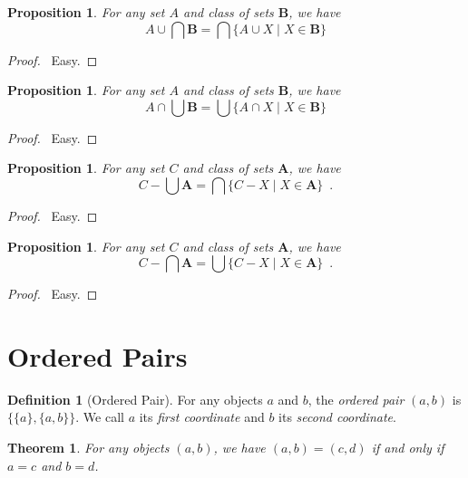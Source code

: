 \documentclass{article}
\let\qed\relax
\newtheorem{proposition}[axiom]{Proposition}
\newtheorem{theorem}[axiom]{Theorem}
\theoremstyle{definition}
\newtheorem{definition}[axiom]{Definition}
\begin{document}
    \begin{proposition}
        For any set $A$ and class of sets $\mathbf{B}$, we have
        \[ A \cup \bigcap \mathbf{B} = \bigcap \{ A \cup X \mid X \in \mathbf{B} \} \]
    \end{proposition}

    \begin{proof}
        \pf\ Easy. \qed
    \end{proof}

    \begin{proposition}
        For any set $A$ and class of sets $\mathbf{B}$, we have
        \[ A \cap \bigcup \mathbf{B} = \bigcup \{ A \cap X \mid X \in \mathbf{B} \} \]
    \end{proposition}

    \begin{proof}
        \pf\ Easy. \qed
    \end{proof}

    \begin{proposition}
        For any set $C$ and class of sets $\mathbf{A}$, we have
        \[ C - \bigcup \mathbf{A} = \bigcap \{ C - X \mid X \in \mathbf{A} \} \enspace . \]
    \end{proposition}

    \begin{proof}
        \pf\ Easy. \qed
    \end{proof}

    \begin{proposition}
        For any set $C$ and class of sets $\mathbf{A}$, we have
        \[ C - \bigcap \mathbf{A} = \bigcup \{ C - X \mid X \in \mathbf{A} \} \enspace . \]
    \end{proposition}

    \begin{proof}
        \pf\ Easy. \qed
    \end{proof}

    \section{Ordered Pairs}

    \begin{definition}[Ordered Pair]
        For any objects $a$ and $b$, the \emph{ordered pair} $(a,b)$ is $\{ \{ a \}, \{a, b \} \}$.
        We call $a$ its \emph{first coordinate} and $b$ its \emph{second coordinate}.
    \end{definition}

    \begin{theorem}
        For any objects $(a,b)$, we have $(a,b) = (c,d)$ if and only if $a = c$ and $b = d$.
    \end{theorem}
\end{document}
